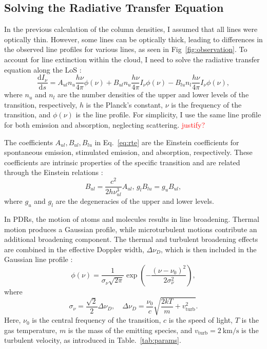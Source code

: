\documentclass[12pt,a4paper]{article}
\newcommand{\mr}{\mathrm}
\newcommand{\fird}[2][]{\frac{\mathrm{d}#1}{\mathrm{d}#2}}
\newcommand{\qt}[1]{\textcolor{red}{#1}}
\begin{document}
\subsection{Solving the Radiative Transfer Equation}
In the previous calculation of the column densities, I assumed that all lines were optically thin. However, some lines can be optically thick, leading to differences in the observed line profiles for various lines, as seen in Fig~\ref{fig:observation}. To account for line extinction within the cloud, I need to solve the radiative transfer equation along the LoS \parencite[see, e.g.,][ Eq.~1.67]{Rybicki1979}:
\begin{equation}
    \fird[I_\nu]{s} = A_{ul} n_u\frac{h\nu}{4\pi}\phi(\nu) +  B_{ul} n_u\frac{h\nu}{4\pi}I_\nu \phi(\nu) -  B_{lu} n_l\frac{h\nu}{4\pi}I_\nu \phi(\nu), \label{eq:rte}
\end{equation}  
where $n_u$ and $n_l$ are the number densities of the upper and lower levels of the transition, respectively, $h$ is the Planck's constant, $\nu$ is the frequency of the transition, and $\phi(\nu)$ is the line profile. For simplicity, I use the same line profile for both emission and absorption, neglecting scattering. \qt{justify?}

The coefficients $A_{ul}, B_{ul}, B_{lu}$ in Eq.~\ref{eq:rte} are the Einstein coefficients for spontaneous emission, stimulated emission, and absorption, respectively. These coefficients are intrinsic properties of the specific transition and are related through the Einstein relations \parencite{Einstein1917}:
\begin{equation}
    B_{ul} = \frac{c^2}{2 h \nu_{ul}^3} A_{ul},\, g_l B_{lu} = g_u B_{ul},
\end{equation}
where $g_u$ and $g_l$ are the degeneracies of the upper and lower levels.

In PDRs, the motion of atoms and molecules results in line broadening. Thermal motion produces a Gaussian profile, while microturbulent motions contribute an additional broadening component. The thermal and turbulent broadening effects are combined in the effective Doppler width, $\Delta \nu_D$, which is then included in the Gaussian line profile \parencite[see, e.g.,][Eqs.~10.68-10.72]{Rybicki1979}:
\begin{equation}
    \phi(\nu) = \frac{1}{\sigma_\nu \sqrt{2 \pi}}\exp\left(-\frac{(\nu - \nu_0)^2}{2 \sigma_\nu^2}\right),
\end{equation}
where
\begin{equation}
    \sigma_\nu = \frac{\sqrt{2}}{2}\Delta \nu_D, \quad \Delta \nu_D = \frac{\nu_0}{c}\sqrt{\frac{2 k T}{m} + v_\mr{turb}^2}.
\end{equation}
Here, $\nu_0$ is the central frequency of the transition, $c$ is the speed of light, $T$ is the gas temperature, $m$ is the mass of the emitting species, and $v_\mr{turb} = \qty{2}{\km\per\second}$ is the turbulent velocity, as introduced in Table.~\ref{tab:params}.
\end{document}

